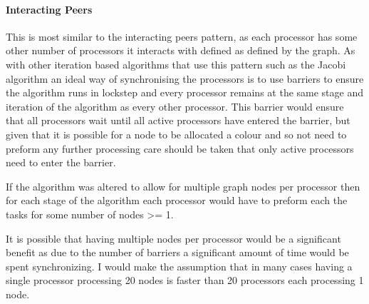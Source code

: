 \documentclass[11pt,a4paper]{article}
\begin{document}
\paragraph{Interacting Peers} This is most similar to the interacting peers pattern,
as each processor
has some other number of processors it interacts with defined as defined
by the graph. As with other iteration based algorithms that use this
pattern such as the Jacobi algorithm an ideal way of synchronising the
processors is to use barriers to ensure the algorithm runs in lockstep
and every processor remains at the same stage and iteration of the
algorithm as every other processor. This barrier would ensure that all
processors wait until all active processors have entered the barrier,
but given that it is possible for a node to be allocated a colour and so
not need to preform any further processing care should be taken that
only active processors need to enter the barrier.

If the algorithm was altered to allow for multiple graph nodes per
processor then for each stage of the algorithm each processor would have
to preform each the tasks for some number of nodes >= 1. 

It is possible that having multiple nodes per processor would be a significant benefit as
due to the number of barriers a significant amount of time would be spent synchronizing.
I would make the assumption that in many cases having a single processor processing 20 nodes is
faster than 20 processors each processing 1 node.

%
\end{document}
